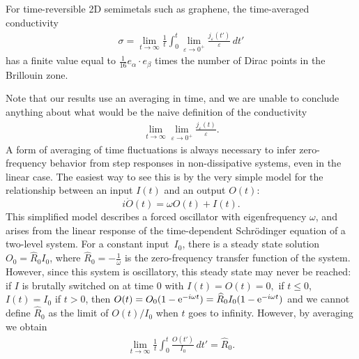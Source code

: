 \documentclass[a4paper,11pt]{article}
\theoremstyle{plain}
\theoremstyle{remark}
\def\eps{{\varepsilon}}
\begin{document}
For time-reversible 2D semimetals such as graphene, the time-averaged conductivity
\begin{align}\label{def:conductivity}
\sigma = \lim_{t\to\infty}\frac1t\int_0^t
\lim_{\eps\to0^+}\frac{j_\eps(t')}{\eps}\,dt'
\end{align}
has a finite value equal to $\frac1{16}e_\alpha\cdot e_\beta$ times
the number of Dirac points in the Brillouin zone.


Note that our results use an averaging in time, and we are unable to
conclude anything about what would be the naive definition of the
conductivity
\begin{align}
  \label{eq:conductivity_naive}
  \lim_{t \to  \infty} \lim_{\eps \to 0^+} \frac{j_\eps(t)}{\eps}.
\end{align}
A form of averaging of time fluctuations is always necessary to infer
zero-frequency behavior from step responses in non-dissipative
systems, even in the linear case. The easiest way to see this is by
the very simple model for the relationship between an input $I(t)$ and
an output $O(t)$:
  \begin{equation} \label{eq:toymodel}
    i \dot O(t) = \omega O(t) + I(t).
  \end{equation}
  This simplified model describes a forced oscillator with eigenfrequency $\omega$, and arises from the linear response of the time-dependent Schr\"odinger equation of a two-level system. For a
  constant input~$I_{0}$, there is a steady state solution
  $O_0 = \widehat R_0 I_{0}$, where $\widehat R_0 = -\frac 1 \omega$ is
  the zero-frequency transfer function of the system. However, since
  this system is oscillatory, this steady state may never be reached:
  if $I$ is brutally switched on at time $0$ with $I(t) = O(t) = 0,$
  if $t \leq 0$, $I(t) = I_{0}$ if $t > 0$, then
  $ O(t) = O_0(1- {\rm e}^{-i\omega t}) = \widehat{R}_0 I_{0} (1- {\rm
    e}^{-i\omega t})$ and we cannot define $\widehat R_0$ as the limit
  of $O(t)/I_{0}$ when $t$ goes to infinity. However, by averaging we
  obtain
  \begin{align*}
     \lim_{t\to\infty}\frac 1 t  \int_{0}^{t} \frac{O(t')}{I_{0}} \, dt' = \widehat R_0.
   \end{align*}
\end{document}
